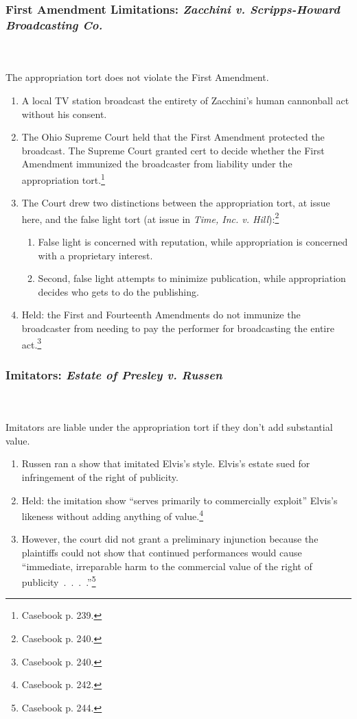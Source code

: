 \subsubsection{First Amendment Limitations: \emph{Zacchini v. Scripps-Howard 
Broadcasting Co.}}
~\\\\
The appropriation tort does not violate the First Amendment.

\begin{enumerate}
    \item A local TV station broadcast the entirety of Zacchini's human 
    cannonball act without his consent.
    \item The Ohio Supreme Court held that the First Amendment protected the 
    broadcast. The Supreme Court granted cert to decide whether the First 
    Amendment immunized the broadcaster from liability under the appropriation 
    tort.\footnote{Casebook p. 239.}
    \item The Court drew two distinctions between the appropriation tort, at 
    issue here, and the false light tort (at issue in \emph{Time, Inc. v. 
    Hill}):\footnote{Casebook p. 240.}
    \begin{enumerate}
        \item False light is concerned with reputation, while appropriation is 
        concerned with a proprietary interest.
        \item Second, false light attempts to minimize publication, while 
        appropriation decides who gets to do the publishing.
    \end{enumerate}
    \item Held: the First and Fourteenth Amendments do not immunize the 
    broadcaster from needing to pay the performer for broadcasting the entire 
    act.\footnote{Casebook p. 240.}
\end{enumerate}

\subsubsection{Imitators: \emph{Estate of Presley v. Russen}}
~\\\\
Imitators are liable under the appropriation tort if they don't add substantial 
value.

\begin{enumerate}
    \item Russen ran a show that imitated Elvis's style. Elvis's estate sued for 
    infringement of the right of publicity.
    \item Held: the imitation show ``serves primarily to commercially exploit'' 
    Elvis's likeness without adding anything of value.\footnote{Casebook p. 
    242.}
    \item However, the court did not grant a preliminary injunction because the 
    plaintiffs could not show that continued performances would cause 
    ``immediate, irreparable harm to the commercial value of the right of 
    publicity~.~.~.~.''\footnote{Casebook p. 244.}
\end{enumerate}
